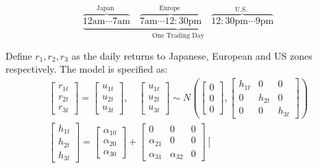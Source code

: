\documentclass[11pt]{article}
\begin{document}
\begin{equation}
\underbrace{\overbrace{12 \mathrm{am} \cdots 7 \mathrm{am}}^{\text {Japan }}\quad \overbrace{7 \mathrm{am} \cdots 12: 30 \mathrm{pm}}^{\text {Europe }}\quad \overbrace{12: 30 \mathrm{pm} \cdots 9 \mathrm{pm}}^{\text {U.S. }}}_{\text{One Trading Day}}
\end{equation}

Define $r_1, r_2, r_3$ as the daily returns to Japanese, European and US zones respectively. The model is specified as:
\begin{equation}
    \begin{gathered}
    \left[\begin{array}{l}
r_{1 t} \\
r_{2 t} \\
r_{3 t}
\end{array}\right]=\left[\begin{array}{l}
u_{1 t} \\
u_{2 t} \\
u_{3 t}
\end{array}\right], \quad\left[\begin{array}{l}
u_{1 t} \\
u_{2 t} \\
u_{3 t}
\end{array}\right] \sim N\left(\left[\begin{array}{l}
0 \\
0 \\
0
\end{array}\right],\left[\begin{array}{ccc}
h_{1 t} & 0 & 0 \\
0 & h_{2 t} & 0 \\
0 & 0 & h_{3 t}
\end{array}\right]\right) \\
{\left[\begin{array}{l}
h_{1 t} \\
h_{2 t} \\
h_{3 t}
\end{array}\right]=\left[\begin{array}{l}
\alpha_{10} \\
\alpha_{20} \\
\alpha_{30}
\end{array}\right] } +\left[\begin{array}{ccc}
0 & 0 & 0 \\
\alpha_{21} & 0 & 0 \\
\alpha_{31} & \alpha_{32} & 0
\end{array}\right]\left[\begin{array}{l}

\end{array}
\end{gathered}
\end{equation}
\end{document}
